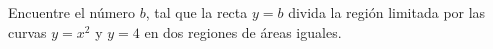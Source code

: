 \item Encuentre el número $b$, tal que la recta $y = b$ divida la región limitada por las curvas $y = x^2$ y $y = 4$ en dos regiones de áreas iguales.
